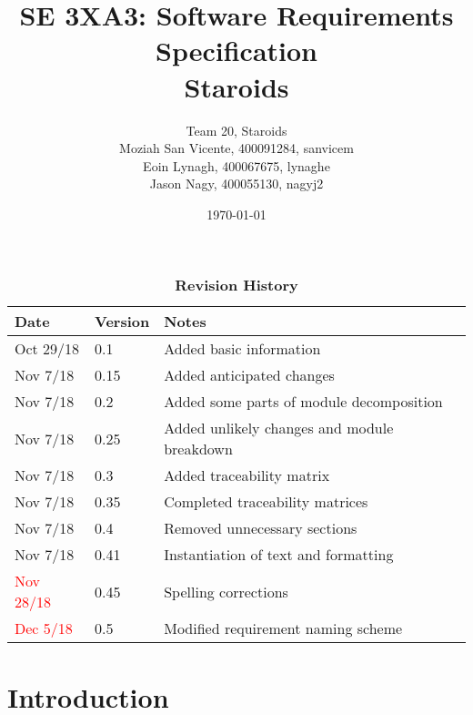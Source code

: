 \documentclass[12pt, titlepage]{article}
\title{SE 3XA3: Software Requirements Specification\\Staroids}
\author{Team 20, Staroids
  \\ Moziah San Vicente, 400091284, sanvicem
  \\ Eoin Lynagh, 400067675, lynaghe
  \\ Jason Nagy, 400055130, nagyj2
}
\date{\today}
\begin{document}
\maketitle

\tableofcontents
\listoftables
\listoffigures

\begin{table}[bp]
\caption{\bf Revision History}
\begin{tabularx}{\textwidth}{p{3cm}p{2cm}X}
\toprule {\bf Date} & {\bf Version} & {\bf Notes}\\
\midrule
Oct 29/18 & 0.1 & Added basic information\\
Nov 7/18 & 0.15 & Added anticipated changes\\
Nov 7/18 & 0.2 & Added some parts of module decomposition\\
Nov 7/18 & 0.25 & Added unlikely changes and module breakdown\\
Nov 7/18 & 0.3 & Added traceability matrix\\
Nov 7/18 & 0.35 & Completed traceability matrices\\
Nov 7/18 & 0.4 & Removed unnecessary sections\\
Nov 7/18 & 0.41 & Instantiation of text and formatting\\
\textcolor{red}{Nov 28/18} & 0.45 & Spelling corrections\\
\textcolor{red}{Dec 5/18} & 0.5 & Modified requirement naming scheme\\
\bottomrule
\end{tabularx}
\end{table}

\newpage


\section{Introduction}
\end{document}
